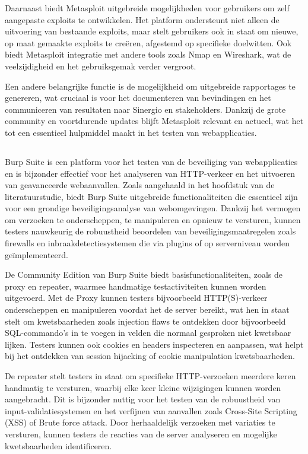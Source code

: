 Daarnaast biedt Metasploit uitgebreide mogelijkheden voor gebruikers om zelf aangepaste exploits te ontwikkelen. Het platform 
ondersteunt niet alleen de uitvoering van bestaande exploits, maar stelt gebruikers ook in staat om nieuwe, op maat gemaakte 
exploits te creëren, afgestemd op specifieke doelwitten. Ook biedt Metasploit integratie met andere 
tools zoals Nmap en Wireshark, wat de veelzijdigheid en het gebruiksgemak verder vergroot. 

Een andere belangrijke functie is de mogelijkheid om uitgebreide rapportages te genereren, 
wat cruciaal is voor het documenteren van bevindingen en het communiceren van resultaten naar Sinergio en stakeholders. Dankzij de grote 
community en voortdurende updates blijft Metasploit relevant en actueel, wat het tot een essentieel hulpmiddel maakt in het 
testen van webapplicaties.

\subsection{}
Burp Suite is een platform voor het testen van de beveiliging van webapplicaties en is bijzonder effectief voor 
het analyseren van HTTP-verkeer en het uitvoeren van geavanceerde webaanvallen. Zoals aangehaald in het hoofdstuk  
van de literatuurstudie, biedt Burp Suite uitgebreide functionaliteiten die essentieel zijn voor een grondige beveiligingsanalyse 
van webomgevingen. Dankzij het vermogen om verzoeken te onderscheppen, te manipuleren en opnieuw te versturen, kunnen 
testers nauwkeurig de robuustheid beoordelen van beveiligingsmaatregelen zoals firewalls en inbraakdetectiesystemen die via 
plugins of op serverniveau worden geïmplementeerd. 

De Community Edition van Burp Suite biedt basisfunctionaliteiten, zoals de proxy en repeater, 
waarmee handmatige testactiviteiten kunnen worden uitgevoerd. Met de Proxy kunnen testers bijvoorbeeld HTTP(S)-verkeer 
onderscheppen en manipuleren voordat het de server bereikt, wat hen in staat stelt om kwetsbaarheden zoals injection flaws 
te ontdekken door bijvoorbeeld SQL-commando's in te voegen in velden die normaal gesproken niet kwetsbaar lijken. Testers 
kunnen ook cookies en headers inspecteren en aanpassen, wat helpt bij het ontdekken van session hijacking of cookie 
manipulation kwetsbaarheden.

De repeater stelt testers in staat om specifieke HTTP-verzoeken meerdere keren handmatig te versturen, waarbij elke keer 
kleine wijzigingen kunnen worden aangebracht. Dit is bijzonder nuttig voor het testen van de robuustheid van 
input-validatiesystemen en het verfijnen van aanvallen zoals Cross-Site Scripting (XSS) of Brute force attack. Door 
herhaaldelijk verzoeken met variaties te versturen, kunnen testers de reacties van de server analyseren en mogelijke 
kwetsbaarheden identificeren.

